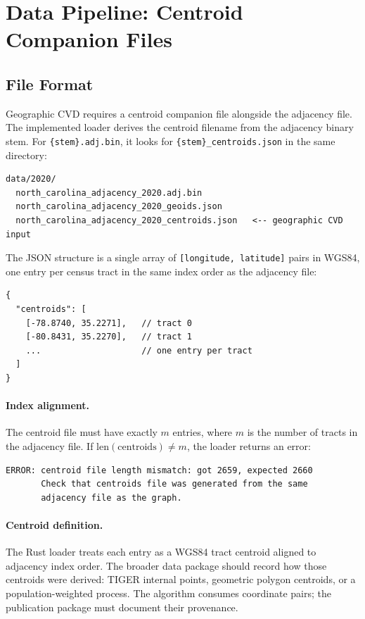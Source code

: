 \section{Data Pipeline: Centroid Companion Files}
\label{sec:data-pipeline}

\subsection{File Format}

Geographic CVD requires a centroid companion file alongside the adjacency
file. The implemented loader derives the centroid filename from the adjacency
binary stem. For \texttt{\{stem\}.adj.bin}, it looks for
\texttt{\{stem\}\_centroids.json} in the same directory:

\begin{verbatim}
data/2020/
  north_carolina_adjacency_2020.adj.bin
  north_carolina_adjacency_2020_geoids.json
  north_carolina_adjacency_2020_centroids.json   <-- geographic CVD input
\end{verbatim}

The JSON structure is a single array of \texttt{[longitude, latitude]} pairs
in WGS84, one entry per census tract in the same index order as the
adjacency file:

\begin{verbatim}
{
  "centroids": [
    [-78.8740, 35.2271],   // tract 0
    [-80.8431, 35.2270],   // tract 1
    ...                    // one entry per tract
  ]
}
\end{verbatim}

\paragraph{Index alignment.}
The centroid file must have exactly $m$ entries, where $m$ is the number of
tracts in the adjacency file.
If $\mathrm{len}(\mathrm{centroids}) \ne m$, the loader returns an error:

\begin{verbatim}
ERROR: centroid file length mismatch: got 2659, expected 2660
       Check that centroids file was generated from the same
       adjacency file as the graph.
\end{verbatim}

\paragraph{Centroid definition.}
The Rust loader treats each entry as a WGS84 tract centroid aligned to
adjacency index order. The broader data package should record how those
centroids were derived: TIGER internal points, geometric polygon centroids, or
a population-weighted process. The algorithm consumes coordinate pairs; the
publication package must document their provenance.

